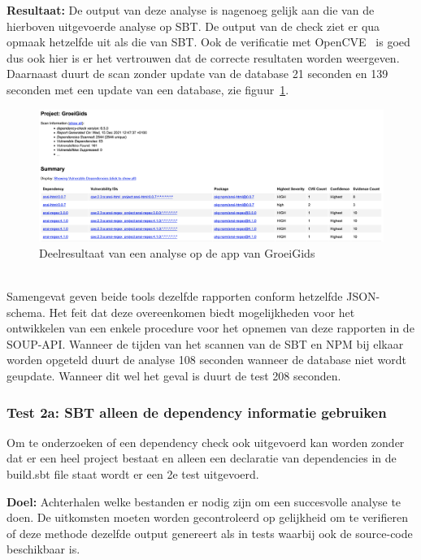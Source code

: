 \textbf{Resultaat:} De output van deze analyse is nagenoeg gelijk aan die van de hierboven uitgevoerde analyse op SBT. De output van de check ziet er qua opmaak hetzelfde uit als die van SBT. Ook de verificatie met OpenCVE~\citep{openCve:z.d.} is goed dus ook hier is er het vertrouwen dat de correcte resultaten worden weergeven. Daarnaast duurt de scan zonder update van de database 21 seconden en 139 seconden met een update van een database, zie figuur~\ref{fig:NPMReport1b}.

\begin{figure}
    \myfloatalign
    \includegraphics[width=15cm]{gfx/report_analyse_test1b_NPM}
    \caption{Deelresultaat van een analyse op de app van GroeiGids}
    \label{fig:NPMReport1b}
\end{figure}
\\
Samengevat geven beide tools dezelfde rapporten conform hetzelfde JSON-schema. Het feit dat deze overeenkomen biedt mogelijkheden voor het ontwikkelen van een enkele procedure voor het opnemen van deze rapporten in de SOUP-API.
Wanneer de tijden van het scannen van de SBT en NPM bij elkaar worden opgeteld duurt de analyse 108 seconden wanneer de database niet wordt geupdate. Wanneer dit wel het geval is duurt de test 208 seconden.

\subsubsection{Test 2a: SBT alleen de dependency informatie gebruiken}
Om te onderzoeken of een dependency check ook uitgevoerd kan worden zonder dat er een heel project bestaat en alleen een declaratie van dependencies in de build.sbt file staat wordt er een 2e test uitgevoerd.

\textbf{Doel:} Achterhalen welke bestanden er nodig zijn om een succesvolle analyse te doen. De uitkomsten moeten worden gecontroleerd op gelijkheid om te verifieren of deze methode dezelfde output genereert als in tests waarbij ook de source-code beschikbaar is.


